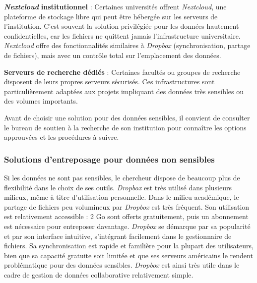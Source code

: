 \documentclass[
  letterpaper,
  DIV=11,
  numbers=noendperiod,
  oneside]{scrreprt}
\begin{document}
\textbf{\emph{Nextcloud}} \textbf{institutionnel} : Certaines
universités offrent \emph{Nextcloud}, une plateforme de stockage libre
qui peut être hébergée sur les serveurs de l'institution. C'est souvent
la solution privilégiée pour les données hautement confidentielles, car
les fichiers ne quittent jamais l'infrastructure universitaire.
\emph{Nextcloud} offre des fonctionnalités similaires à \emph{Dropbox}
(synchronisation, partage de fichiers), mais avec un contrôle total sur
l'emplacement des données.

\textbf{Serveurs de recherche dédiés} : Certaines facultés ou groupes de
recherche disposent de leurs propres serveurs sécurisés. Ces
infrastructures sont particulièrement adaptées aux projets impliquant
des données très sensibles ou des volumes importants.

Avant de choisir une solution pour des données sensibles, il convient de
consulter le bureau de soutien à la recherche de son institution pour
connaître les options approuvées et les procédures à suivre.

\hypertarget{solutions-dentreposage-pour-donnuxe9es-non-sensibles}{%
\subsubsection{Solutions d'entreposage pour données non
sensibles}\label{solutions-dentreposage-pour-donnuxe9es-non-sensibles}}

Si les données ne sont pas sensibles, le chercheur dispose de beaucoup
plus de flexibilité dans le choix de ses outils. \emph{Dropbox} est très
utilisé dans plusieurs milieux, même à titre d'utilisation personnelle.
Dans le milieu académique, le partage de fichiers peu volumineux par
\emph{Dropbox} est très fréquent. Son utilisation est relativement
accessible : 2 Go sont offerts gratuitement, puis un abonnement est
nécessaire pour entreposer davantage. \emph{Dropbox} se démarque par sa
popularité et par son interface intuitive, s'intégrant facilement dans
le gestionnaire de fichiers. Sa synchronisation est rapide et familière
pour la plupart des utilisateurs, bien que sa capacité gratuite soit
limitée et que ses serveurs américains le rendent problématique pour des
données sensibles. \emph{Dropbox} est ainsi très utile dans le cadre de
gestion de données collaborative relativement simple.
\end{document}
